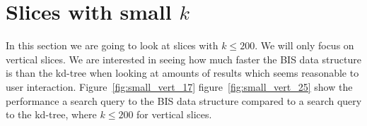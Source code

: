 \section{Slices with small $k$}
\label{sect:smallk}


In this section we are going to look at slices with $k\leq 200$. We will only focus on vertical slices. We are interested in seeing how much faster the BIS data structure is than the kd-tree when looking at amounts of results which seems reasonable to user interaction. Figure~\ref{fig:small_vert_17} figure~\ref{fig:small_vert_25} show the performance a search query to the BIS data structure compared to a search query to the kd-tree, where $k \leq 200$ for vertical slices.

\begin{figure}[h]
\end{figure}

